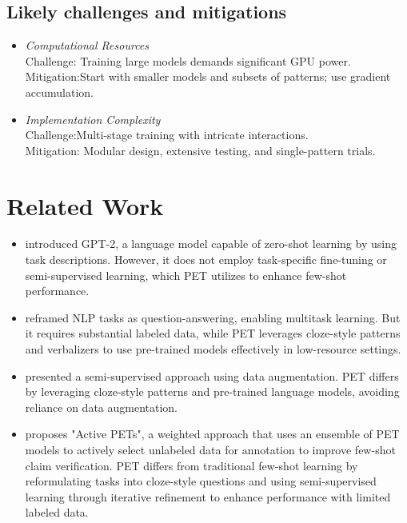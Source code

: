 \documentclass[11pt,a4paper]{article}
\begin{document}
            \subsection{Likely challenges and mitigations}
            \begin{itemize}[topsep=0pt]
              \item \textit{Computational Resources}\\Challenge: Training large models demands significant GPU power.
              \\Mitigation:Start with smaller models and subsets of patterns; use gradient accumulation.
              \item \textit{Implementation Complexity}\\Challenge:Multi-stage training with intricate interactions.\\
              Mitigation: Modular design, extensive testing, and single-pattern trials.
            \end{itemize}


\section{Related Work}
\begin{itemize}[topsep=0pt]
  \item \citet{radford2019language} introduced GPT-2, a language model capable of zero-shot learning by using task descriptions. However, it does not employ task-specific fine-tuning or semi-supervised learning, which PET utilizes to enhance few-shot performance.
  \item \citet{mccann2018natural} reframed NLP tasks as question-answering, enabling multitask learning. But it requires substantial labeled data, while PET leverages cloze-style patterns and verbalizers to use pre-trained models effectively in low-resource settings.
  \item  \citet{xie2020unsupervised}presented a semi-supervised approach using data augmentation. PET differs by leveraging cloze-style patterns and pre-trained language models, avoiding reliance on data augmentation.
  \item \citet{zeng-zubiaga-2023-active} proposes "Active PETs", a weighted approach that uses an ensemble of PET models to actively select unlabeled data for annotation to improve few-shot claim verification. PET differs from traditional few-shot learning by reformulating tasks into cloze-style questions and using semi-supervised learning through iterative refinement to enhance performance with limited labeled data.
\end{itemize}
\end{document}
